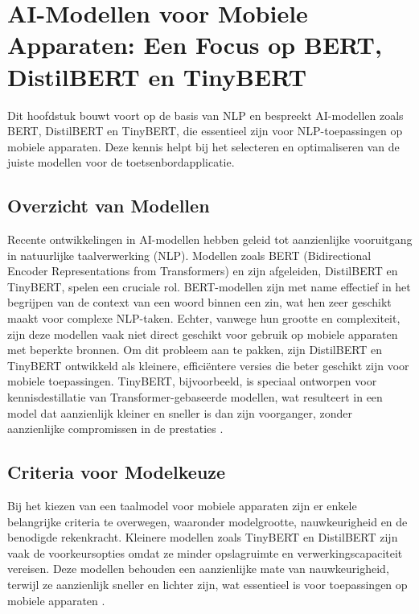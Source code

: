 \section{AI-Modellen voor Mobiele Apparaten: Een Focus op BERT, DistilBERT en TinyBERT}

Dit hoofdstuk bouwt voort op de basis van NLP en bespreekt AI-modellen zoals BERT, DistilBERT en TinyBERT, die essentieel zijn voor NLP-toepassingen op mobiele apparaten. Deze kennis helpt bij het selecteren en optimaliseren van de juiste modellen voor de toetsenbordapplicatie.

\subsection{Overzicht van Modellen}

Recente ontwikkelingen in AI-modellen hebben geleid tot aanzienlijke vooruitgang in natuurlijke taalverwerking (NLP). Modellen zoals BERT (Bidirectional Encoder Representations from Transformers) en zijn afgeleiden, DistilBERT en TinyBERT, spelen een cruciale rol. BERT-modellen zijn met name effectief in het begrijpen van de context van een woord binnen een zin, wat hen zeer geschikt maakt voor complexe NLP-taken. Echter, vanwege hun grootte en complexiteit, zijn deze modellen vaak niet direct geschikt voor gebruik op mobiele apparaten met beperkte bronnen. Om dit probleem aan te pakken, zijn DistilBERT en TinyBERT ontwikkeld als kleinere, efficiëntere versies die beter geschikt zijn voor mobiele toepassingen. TinyBERT, bijvoorbeeld, is speciaal ontworpen voor kennisdestillatie van Transformer-gebaseerde modellen, wat resulteert in een model dat aanzienlijk kleiner en sneller is dan zijn voorganger, zonder aanzienlijke compromissen in de prestaties \autocite{Jiao2019TinyBERT}.

\subsection{Criteria voor Modelkeuze}

Bij het kiezen van een taalmodel voor mobiele apparaten zijn er enkele belangrijke criteria te overwegen, waaronder modelgrootte, nauwkeurigheid en de benodigde rekenkracht. Kleinere modellen zoals TinyBERT en DistilBERT zijn vaak de voorkeursopties omdat ze minder opslagruimte en verwerkingscapaciteit vereisen. Deze modellen behouden een aanzienlijke mate van nauwkeurigheid, terwijl ze aanzienlijk sneller en lichter zijn, wat essentieel is voor toepassingen op mobiele apparaten \autocite{Sun2020MobileBERT}.

